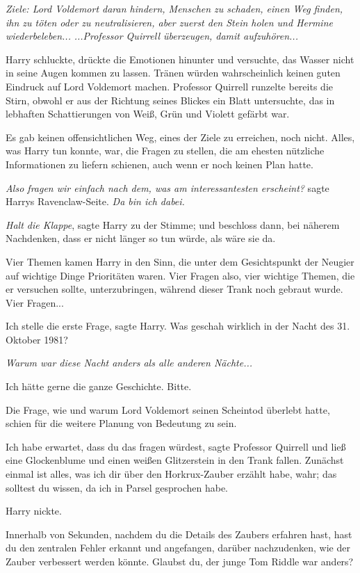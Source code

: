 \emph{Ziele: Lord Voldemort daran hindern, Menschen zu schaden, einen Weg
finden, ihn zu töten oder zu neutralisieren, aber zuerst den Stein holen und
Hermine wiederbeleben...}
\emph{...Professor Quirrell überzeugen, damit aufzuhören...}

Harry schluckte, drückte die Emotionen hinunter und versuchte, das Wasser nicht
in seine Augen kommen zu lassen. Tränen würden wahrscheinlich keinen guten
Eindruck auf Lord Voldemort machen. Professor Quirrell runzelte bereits die
Stirn, obwohl er aus der Richtung seines Blickes ein Blatt untersuchte, das in
lebhaften Schattierungen von Weiß, Grün und Violett gefärbt war.

Es gab keinen offensichtlichen Weg, eines der Ziele zu erreichen, noch nicht.
Alles, was Harry tun konnte, war, die Fragen zu stellen, die am ehesten
nützliche Informationen zu liefern schienen, auch wenn er noch keinen Plan
hatte.

\emph{Also fragen wir einfach nach dem, was am interessantesten erscheint?
}sagte Harrys Ravenclaw-Seite. \emph{Da bin ich dabei.}

\emph{Halt die Klappe}, sagte Harry zu der Stimme; und beschloss dann, bei
näherem Nachdenken, dass er nicht länger so tun würde, als wäre sie da.

Vier Themen kamen Harry in den Sinn, die unter dem Gesichtspunkt der Neugier auf
wichtige Dinge Prioritäten waren. Vier Fragen also, vier wichtige Themen, die er
versuchen sollte, unterzubringen, während dieser Trank noch gebraut wurde. Vier
Fragen...

\glqq{}Ich stelle die erste Frage\grqq{}, sagte Harry. \glqq{}Was geschah wirklich
in der Nacht des 31. Oktober 1981?\grqq{}

\emph{Warum war diese Nacht anders als alle anderen Nächte...}

\glqq{}Ich hätte gerne die ganze Geschichte. Bitte.\grqq{}

Die Frage, wie und warum Lord Voldemort seinen Scheintod überlebt hatte, schien
für die weitere Planung von Bedeutung zu sein.

\glqq{}Ich habe erwartet, dass du das fragen würdest\grqq{}, sagte Professor
Quirrell und ließ eine Glockenblume und einen weißen Glitzerstein in den Trank
fallen. \glqq{}Zunächst einmal ist alles, was ich dir über den Horkrux-Zauber
erzählt habe, wahr; das solltest du wissen, da ich in Parsel gesprochen
habe.\grqq{}

Harry nickte.

\glqq{}Innerhalb von Sekunden, nachdem du die Details des Zaubers erfahren hast,
hast du den zentralen Fehler erkannt und angefangen, darüber nachzudenken, wie
der Zauber verbessert werden könnte. Glaubst du, der junge Tom Riddle war
anders?\grqq{}

